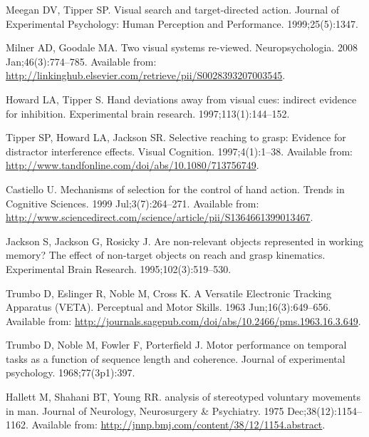 \documentclass[10pt,letterpaper]{article}
\begin{document}
\begin{thebibliography}{10}
Meegan DV, Tipper SP.
\newblock Visual search and target-directed action.
\newblock Journal of Experimental Psychology: Human Perception and Performance.
  1999;25(5):1347.

Milner AD, Goodale MA.
\newblock Two visual systems re-viewed.
\newblock Neuropsychologia. 2008 Jan;46(3):774--785.
\newblock Available from:
  \url{http://linkinghub.elsevier.com/retrieve/pii/S0028393207003545}.

Howard LA, Tipper S.
\newblock Hand deviations away from visual cues: indirect evidence for
  inhibition.
\newblock Experimental brain research. 1997;113(1):144--152.

Tipper SP, Howard LA, Jackson SR.
\newblock Selective reaching to grasp: {Evidence} for distractor interference
  effects.
\newblock Visual Cognition. 1997;4(1):1--38.
\newblock Available from:
  \url{http://www.tandfonline.com/doi/abs/10.1080/713756749}.

Castiello U.
\newblock Mechanisms of selection for the control of hand action.
\newblock Trends in Cognitive Sciences. 1999 Jul;3(7):264--271.
\newblock Available from:
  \url{http://www.sciencedirect.com/science/article/pii/S1364661399013467}.

Jackson S, Jackson G, Rosicky J.
\newblock Are non-relevant objects represented in working memory? {The} effect
  of non-target objects on reach and grasp kinematics.
\newblock Experimental Brain Research. 1995;102(3):519--530.

Trumbo D, Eslinger R, Noble M, Cross K.
\newblock A {Versatile} {Electronic} {Tracking} {Apparatus} ({VETA}).
\newblock Perceptual and Motor Skills. 1963 Jun;16(3):649--656.
\newblock Available from:
  \url{http://journals.sagepub.com/doi/abs/10.2466/pms.1963.16.3.649}.

Trumbo D, Noble M, Fowler F, Porterfield J.
\newblock Motor performance on temporal tasks as a function of sequence length
  and coherence.
\newblock Journal of experimental psychology. 1968;77(3p1):397.

Hallett M, Shahani BT, Young RR.
 analysis of stereotyped voluntary movements in man.
\newblock Journal of Neurology, Neurosurgery \& Psychiatry. 1975
  Dec;38(12):1154--1162.
\newblock Available from:
  \url{http://jnnp.bmj.com/content/38/12/1154.abstract}.


\end{thebibliography}
\end{document}
